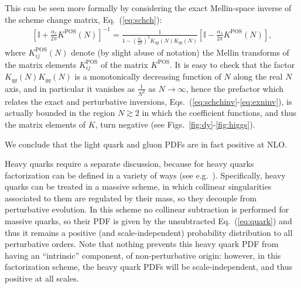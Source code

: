 This can be seen more formally by considering the exact Mellin-space
inverse of the scheme change matrix, Eq.~(\ref{eq:schch}):
\begin{align}\label{eq:exninv}
\left[\mathbb{I}
  +\frac{\alpha_s}{2\pi}  K^{\textrm{POS}}(N) \right] ^{-1}=
\frac{1}{1-\left(\frac{\alpha_s}{2\pi}\right)^2 K_{qg}(N)K_{gq}(N) } \left[\mathbb{I}
  -\frac{\alpha_s}{2\pi}  K^{\textrm{POS}}(N)\right],
\end{align}
where $K^{\textrm{POS}}_{ij}(N)$ denote (by slight abuse of notation) the Mellin
transforms of the matrix elements $K^{\textrm{POS}}_{ij}$ of the matrix
$K^{\textrm{POS}}$.
It is easy to check that the factor $ K_{qg}(N)K_{gq}(N)$ is a
monotonically decreasing function of $N$ along the real $N$ axis, and
in particular it vanishes as $\frac{1}{N^2}$ as $N\to\infty$, hence
the prefactor which relates the exact and perturbative inversions,
Eqs.~(\ref{eq:schchinv}-\ref{eq:exninv}), is actually bounded in the
region $N\gtrsim 2$ in which the \msbar{} coefficient functions, and
thus the matrix elements of $K$, turn negative (see Figs.~\ref{fig:dy}-\ref{fig:higgs}). 

We conclude that the light quark and gluon \msbar{} PDFs are in fact positive
at NLO.

Heavy quarks require a separate discussion, because for heavy quarks \msbar{}
factorization can be defined in a variety of ways (see
e.g.~\cite{Forte:2010ta}).
Specifically, heavy quarks can be treated in a
massive scheme, in which   collinear singularities
associated to them are regulated by their mass, so they decouple from
perturbative evolution. In this scheme no collinear subtraction is
performed for massive quarks, so their PDF is given by the
unsubtracted 
Eq.~(\ref{eq:quark})  and thus it remains a  positive (and
scale-independent) probability distribution to all perturbative
orders. Note that nothing prevents this heavy quark PDF from having an
``intrinsic''  component, of non-perturbative origin: however, in this
factorization scheme, the heavy quark PDFs will be scale-independent,
and thus positive at all scales.

